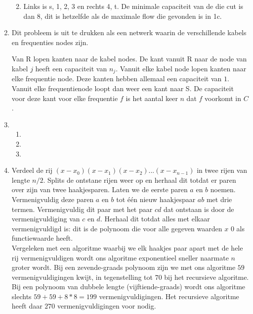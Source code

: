 \documentclass[11pt]{article}
\begin{document}
\begin{enumerate}
\begin{enumerate}


            \item
                Links is s, 1, 2, 3 en rechts 4, t. De minimale capaciteit van
                de die cut is dan 8, dit is hetzelfde als de maximale flow die
                gevonden is in 1c.

        \end{enumerate}

    \item
        Dit probleem is uit te drukken als een netwerk waarin de verschillende kabels
        en frequenties nodes zijn.

        Van R lopen kanten naar de kabel nodes. De kant vanuit R naar de node
        van kabel $j$ heeft een capaciteit van $n_j$. Vanuit elke kabel node
        lopen kanten naar elke frequentie node. Deze kanten hebben allemaal een
        capaciteit van $1$. Vanuit elke frequentienode loopt dan weer een kant
        naar S. De capaciteit voor deze kant voor elke frequentie $f$ is het
        aantal keer $n$ dat $f$ voorkomt in $C$.


    \item
        \begin{enumerate}
            \item

            \item

            \item

        \end{enumerate}

    \item Verdeel de rij $(x - x_0)(x - x_1)(x - x_2) ... (x - x_{n-1})$ in twee rijen van lengte $n/2$. Splits de ontstane rijen weer op en herhaal dit totdat er paren over zijn van twee haakjesparen. Laten we de eerste paren $a$ en $b$ noemen. Vermenigvuldig deze paren $a$ en $b$ tot één nieuw haakjespaar $ab$ met drie termen. Vermenigvuldig dit paar met het paar $cd$ dat ontstaan is door de vermenigvuldiging van $c$ en $d$. Herhaal dit totdat alles met elkaar vermenigvuldigd is: dit is de polynoom die voor alle gegeven waarden $x$ $0$ als functiewaarde heeft.\\
    Vergeleken met een algoritme waarbij we elk haakjes paar apart met de hele rij vermenigvuldigen wordt ons algoritme exponentieel sneller naarmate $n$ groter wordt. Bij een zevende-graads polynoom zijn we met ons algoritme $59$ vermenigvuldigingen kwijt, in tegenstelling tot $70$ bij het recursieve algoritme. Bij een polynoom van dubbele lengte (vijftiende-graads) wordt ons algoritme slechts $59 + 59 + 8*8 = 199$ vermenigvuldigingen. Het recursieve algoritme heeft daar $270$ vermenigvuldigingen voor nodig.

\end{enumerate}
\end{document}
